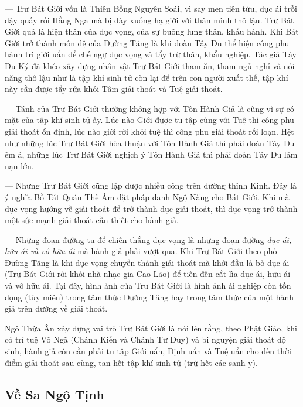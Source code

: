 --- Trư Bát Giới vốn là Thiên Bồng Nguyên Soái, vì say men tiên tửu, dục ái trỗi dậy quấy rối Hằng Nga mà bị đày xuống hạ giới với thân mình thô lậu. Trư Bát Giới quả là hiện thân của dục vọng, của sự buông lung thân, khẩu hành. Khi Bát Giới trở thành môn đệ của Đường Tăng là khi đoàn Tây Du thể hiện công phu hành trì giới uẩn để chế ngự dục vọng và tẩy trừ thân, khẩu nghiệp. Tác giả Tây Du Ký đã khéo xây dựng nhân vật Trư Bát Giới tham ăn, tham ngủ nghỉ và nói năng thô lậu như là tập khí sinh tử còn lại để trên con người xuất thế, tập khí này cần được tẩy rửa khỏi Tâm giải thoát và Tuệ giải thoát.

--- Tánh của Trư Bát Giới thường không hợp với Tôn Hành Giả là cũng vì sự có mặt của tập khí sinh tử ấy. Lúc nào Giới được tu tập cùng với Tuệ thì công phu giải thoát ổn định, lúc nào giới rời khỏi tuệ thì công phu giải thoát rối loạn. Hệt như những lúc Trư Bát Giới hòa thuận với Tôn Hành Giả thì phái đoàn Tây Du êm ả, những lúc Trư Bát Giới nghịch ý Tôn Hành Giả thì phái đoàn Tây Du lâm nạn lớn.

--- Nhưng Trư Bát Giới cũng lập được nhiều công trên đường thỉnh Kinh. Đây là ý nghĩa Bồ Tát Quán Thế Âm đặt pháp danh Ngộ Năng cho Bát Giới. Khi mà dục vọng hướng về giải thoát để trở thành dục giải thoát, thì dục vọng trở thành một sức mạnh giải thoát cần thiết cho hành giả.

--- Những đoạn đường tu để chiến thắng dục vọng là những đoạn đường \emph{dục ái, hữu ái và vô hữu ái} mà hành giả phải vượt qua. Khi Trư Bát Giới theo phò Đường Tăng là khi dục vọng chuyển thành giải thoát mà khởi đầu là bỏ dục ái (Trư Bát Giới rời khỏi nhà nhạc gia Cao Lão) để tiến đến cắt lìa dục ái, hữu ái và vô hữu ái. Tại đây, hình ảnh của Trư Bát Giới là hình ảnh ái nghiệp còn tồn đọng (tùy miên) trong tâm thức Đường Tăng hay trong tâm thức của một hành giả trên đường về giải thoát.

Ngô Thừa Ân xây dựng vai trò Trư Bát Giới là nói lên rằng, theo Phật Giáo, khi có trí tuệ Vô Ngã (Chánh Kiến và Chánh Tư Duy) và bi nguyện giải thoát độ sinh, hành giả còn cần phải tu tập Giới uẩn, Định uẩn và Tuệ uẩn cho đến thời điểm giải thoát sau cùng, tan hết tập khí sinh tử (trừ hết các sanh y).

\subsection{Về Sa Ngộ Tịnh} %
\label{sub:ve_sa_ngo_tinh}

